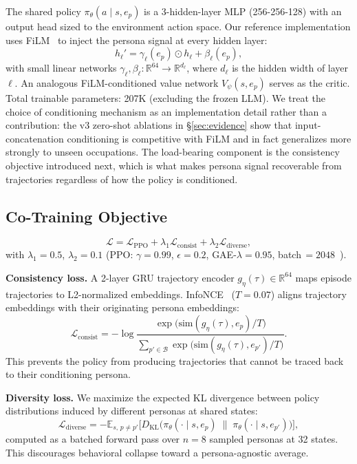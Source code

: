 \documentclass[conference]{IEEEtran}
\begin{document}
The shared policy $\pi_\theta(a \mid s, e_p)$ is a 3-hidden-layer MLP
(256-256-128) with an output head sized to the environment action space.
Our reference
implementation uses FiLM~\cite{perez2018film} to inject the persona signal at
every hidden layer:
\[
  h_\ell' = \gamma_\ell(e_p) \odot h_\ell + \beta_\ell(e_p),
\]
with small linear networks
$\gamma_\ell, \beta_\ell : \mathbb{R}^{64} \to \mathbb{R}^{d_\ell}$,
where $d_\ell$ is the hidden width of layer $\ell$.
An analogous FiLM-conditioned value network $V_\psi(s, e_p)$ serves as the
critic. Total trainable parameters: 207K (excluding the frozen LLM).
We treat the choice of conditioning mechanism as an implementation detail
rather than a contribution: the v3 zero-shot ablations in
\S\ref{sec:evidence} show that input-concatenation conditioning is competitive
with FiLM and in fact generalizes more strongly to unseen occupations. The
load-bearing component is the consistency objective introduced next, which is
what makes persona signal recoverable from trajectories regardless of how
the policy is conditioned.

\subsection{Co-Training Objective}

\begin{equation}
  \mathcal{L} = \mathcal{L}_{\text{PPO}} + \lambda_1 \mathcal{L}_{\text{consist}}
    + \lambda_2 \mathcal{L}_{\text{diverse}},
\end{equation}
with $\lambda_1\!=\!0.5$, $\lambda_2\!=\!0.1$ (PPO: $\gamma\!=\!0.99$,
$\epsilon\!=\!0.2$, GAE-$\lambda\!=\!0.95$, batch\,$=\!2048$~\cite{schulman2017ppo}).

\textbf{Consistency loss.}
A 2-layer GRU trajectory encoder $g_\eta(\tau) \in \mathbb{R}^{64}$
maps episode trajectories to L2-normalized embeddings.
InfoNCE~\cite{oord2018cpc} ($T\!=\!0.07$) aligns trajectory embeddings with
their originating persona embeddings:
\begin{equation}
  \mathcal{L}_{\text{consist}} = -\log
  \frac{\exp\!\bigl(\text{sim}(g_\eta(\tau), e_p)/T\bigr)}
       {\sum_{p' \in \mathcal{B}} \exp\!\bigl(\text{sim}(g_\eta(\tau), e_{p'})/T\bigr)}.
\end{equation}
This prevents the policy from producing trajectories that cannot be traced back
to their conditioning persona.

\textbf{Diversity loss.}
We maximize the expected KL divergence between policy distributions induced by
different personas at shared states:
\begin{equation}
  \mathcal{L}_{\text{diverse}} =
    -\mathbb{E}_{s,\, p \neq p'}\!\bigl[
      D_{\mathrm{KL}}\!\bigl(\pi_\theta(\cdot \mid s, e_p)
        \;\|\; \pi_\theta(\cdot \mid s, e_{p'})\bigr)
    \bigr],
\end{equation}
computed as a batched forward pass over $n\!=\!8$ sampled personas at 32 states.
This discourages behavioral collapse toward a persona-agnostic average.
\end{document}
